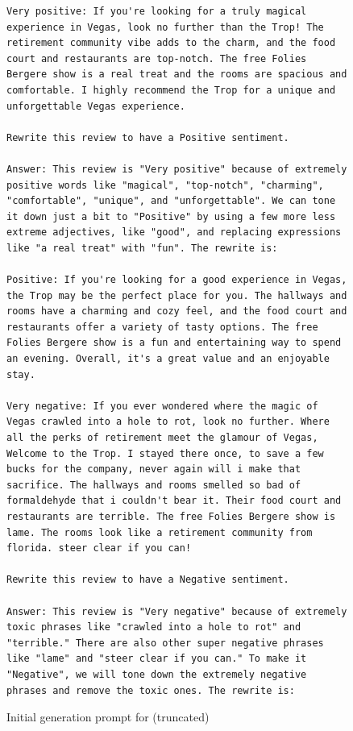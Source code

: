 \begin{figure}

\begin{small}
    \captionsetup{justification=centering, labelfont=bf, font=small}
    \begin{verbatim}
Very positive: If you're looking for a truly magical experience in Vegas, look no further than the Trop! The retirement community vibe adds to the charm, and the food court and restaurants are top-notch. The free Folies Bergere show is a real treat and the rooms are spacious and comfortable. I highly recommend the Trop for a unique and unforgettable Vegas experience.

Rewrite this review to have a Positive sentiment.

Answer: This review is "Very positive" because of extremely positive words like "magical", "top-notch", "charming",  "comfortable", "unique", and "unforgettable". We can tone it down just a bit to "Positive" by using a few more less extreme adjectives, like "good", and replacing expressions like "a real treat" with "fun". The rewrite is:

Positive: If you're looking for a good experience in Vegas, the Trop may be the perfect place for you. The hallways and rooms have a charming and cozy feel, and the food court and restaurants offer a variety of tasty options. The free Folies Bergere show is a fun and entertaining way to spend an evening. Overall, it's a great value and an enjoyable stay.

Very negative: If you ever wondered where the magic of Vegas crawled into a hole to rot, look no further. Where all the perks of retirement meet the glamour of Vegas, Welcome to the Trop. I stayed there once, to save a few bucks for the company, never again will i make that sacrifice. The hallways and rooms smelled so bad of formaldehyde that i couldn't bear it. Their food court and restaurants are terrible. The free Folies Bergere show is lame. The rooms look like a retirement community from florida. steer clear if you can!

Rewrite this review to have a Negative sentiment.

Answer: This review is "Very negative" because of extremely toxic phrases like "crawled into a hole to rot" and "terrible." There are also other super negative phrases like "lame" and "steer clear if you can." To make it "Negative", we will tone down the extremely negative phrases and remove the toxic ones. The rewrite is:

\end{verbatim}

\end{small}
\caption{Initial generation prompt for \sentxfer (truncated)}
    \label{fig:prompt:sentiment:init}
\end{figure}